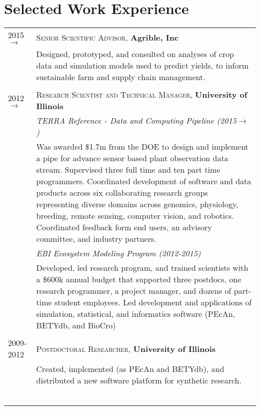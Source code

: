 \documentclass[a4paper,10pt]{article}
\begin{document}
\section{Selected Work Experience}


\begin{tabular}{lp{11cm}}

2015$\rightarrow$ & \textsc{Senior Scientific Advisor}, \textbf{Agrible, Inc}\\
& \footnotesize{Designed, prototyped, and consulted on analyses of crop data and simulation models used to predict yields, to inform sustainable farm and supply chain management. }\\
\multicolumn{2}{c}{} \\

2012$\rightarrow$ & \textsc{Research Scientist and Technical Manager},  \textbf{University of Illinois} \\
& \small \emph{TERRA Reference - Data and Computing Pipeline (2015$\rightarrow$)}\\
&\footnotesize{Was awarded \$1.7m from the DOE %
to design and implement a pipe for advance sensor based plant observation data stream. Supervised three full time and ten part time programmers. Coordinated development of software and data products across six collaborating research groups representing diverse domains across genomics, physiology, breeding, remote sensing, computer vision, and robotics. Coordinated feedback form end users, an advisory committee, and industry partners.
}\\
 & \emph{EBI Ecosystem Modeling Program (2012-2015)}\\
& \footnotesize{Developed, led research program, and trained scientists with a \$600k annual budget that supported three postdocs, one research programmer, a project manager, and dozens of part-time student employees. Led development and applications of simulation, statistical, and informatics software (PEcAn, BETYdb, and BioCro)}\\
\multicolumn{2}{c}{} \\
2009-2012 & \textsc{Postdoctoral Researcher}, \textbf{University of Illinois}\\
& \footnotesize{Created, implemented (as PEcAn and BETYdb), and distributed a new software platform for synthetic research.}\\\
\textsc{} & \\
\multicolumn{2}{c}{} \\


\end{tabular}
\end{document}
